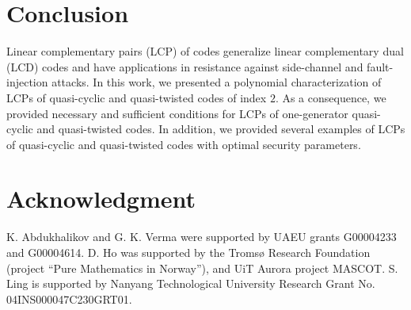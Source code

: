 \documentclass[12 pt]{extarticle}
\numberwithin{equation}{section}
\theoremstyle{definition}
\begin{document}
\section*{Conclusion}
Linear complementary pairs (LCP) of codes generalize linear complementary dual (LCD) codes and have applications in resistance against side-channel and fault-injection attacks. In this work, we presented a polynomial characterization of LCPs of quasi-cyclic and quasi-twisted codes of index $2$. As a consequence, we provided necessary and sufficient conditions for LCPs of one-generator quasi-cyclic and quasi-twisted codes. 
In addition, we provided several examples of LCPs of quasi-cyclic and quasi-twisted codes with optimal security parameters. 
 

\section*{Acknowledgment}

K. Abdukhalikov and G. K. Verma were supported by UAEU grants G00004233 and G00004614. 
D. Ho was supported by   the Tromsø Research Foundation (project “Pure Mathematics in
Norway”), and  UiT Aurora project MASCOT.
S. Ling is supported by Nanyang Technological University Research Grant No. 04INS000047C230GRT01. 




	
\end{document}
